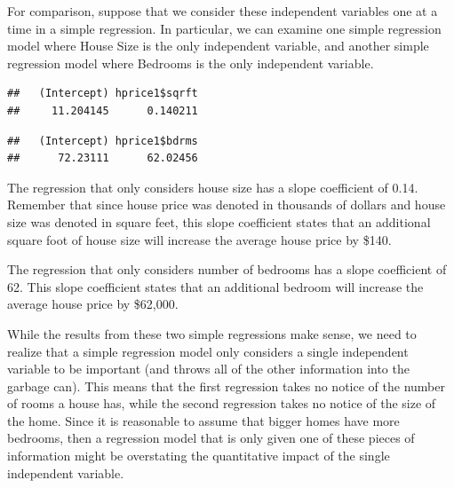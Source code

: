 \documentclass[
]{book}
\newenvironment{Shaded}{\begin{snugshade}}{\end{snugshade}}
\newcommand{\FunctionTok}[1]{\textcolor[rgb]{0.00,0.00,0.00}{#1}}
\newcommand{\NormalTok}[1]{#1}
\newcommand{\OtherTok}[1]{\textcolor[rgb]{0.56,0.35,0.01}{#1}}
\newcommand{\SpecialCharTok}[1]{\textcolor[rgb]{0.00,0.00,0.00}{#1}}
\begin{document}
For comparison, suppose that we consider these independent variables one at a time in a simple regression. In particular, we can examine one simple regression model where House Size is the only independent variable, and another simple regression model where Bedrooms is the only independent variable.

\begin{Shaded}
\end{Shaded}

\begin{verbatim}
##   (Intercept) hprice1$sqrft 
##     11.204145      0.140211
\end{verbatim}

\begin{Shaded}
\end{Shaded}

\begin{verbatim}
##   (Intercept) hprice1$bdrms 
##      72.23111      62.02456
\end{verbatim}

The regression that only considers house size has a slope coefficient of 0.14. Remember that since house price was denoted in thousands of dollars and house size was denoted in square feet, this slope coefficient states that an additional square foot of house size will increase the average house price by \$140.

The regression that only considers number of bedrooms has a slope coefficient of 62. This slope coefficient states that an additional bedroom will increase the average house price by \$62,000.

While the results from these two simple regressions make sense, we need to realize that a simple regression model only considers a single independent variable to be important (and throws all of the other information into the garbage can). This means that the first regression takes no notice of the number of rooms a house has, while the second regression takes no notice of the size of the home. Since it is reasonable to assume that bigger homes have more bedrooms, then a regression model that is only given one of these pieces of information might be overstating the quantitative impact of the single independent variable.
\end{document}

